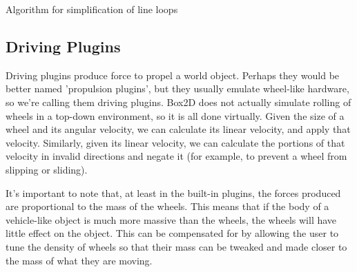 \begin{itemize}
\begin{algorithm}
\begin{algorithmic}
	  \ENDIF
			\ENDIF
			  \ENDIF
			\ENDIF
		\ENDIF
		  \ENDIF
		  		
		\ENDIF
	\ENDWHILE
\end{algorithmic}
\caption{Algorithm for simplification of line loops}
\label{algo:straighten}
\end{algorithm}

\subsection{Driving Plugins}
Driving plugins produce force to propel a world object. Perhaps they would be better named 'propulsion plugins', but they usually emulate wheel-like hardware, so we're calling them driving plugins. Box2D does not actually simulate rolling of wheels in a top-down environment, so it is all done virtually. Given the size of a wheel and its angular velocity, we can calculate its linear velocity, and apply that velocity. Similarly, given its linear velocity, we can calculate the portions of that velocity in invalid directions and negate it (for example, to prevent a wheel from slipping or sliding).

It's important to note that, at least in the built-in plugins, the forces produced are proportional to the mass of the wheels. This means that if the body of a vehicle-like object is much more massive than the wheels, the wheels will have little effect on the object. This can be compensated
for by allowing the user to tune the density of wheels so that their mass
can be tweaked and made closer to the mass of what they are moving.


\end{itemize}
